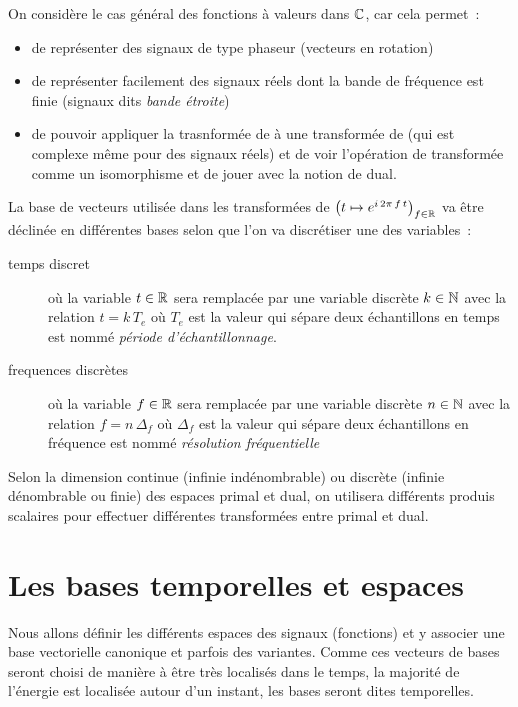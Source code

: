 \begin{remarque}
  On considère le cas général des fonctions à valeurs dans $\mathbb{C}$, car cela permet~:
  \begin{itemize}
  \item de représenter des signaux de type phaseur (vecteurs en rotation)
  \item de représenter facilement des signaux réels dont la bande de
    fréquence est finie (signaux dits \emph{bande étroite})
  \item de pouvoir appliquer la trasnformée de \Fourier{} à une
    transformée de \Fourier{} (qui est complexe même pour des signaux
    réels) et de voir l'opération de transformée comme un isomorphisme
    et de jouer avec la notion de dual.
    \end{itemize}
  \end{remarque}
  

La base de vecteurs utilisée dans les transformées de \Fourier{}
$\left(t\mapsto e^{i\,2\pi\,f\,t}\right)_{f\in\mathbb{R}}$ va être déclinée en différentes
bases selon que l'on va discrétiser une des variables~:

\begin{description}
\item[temps discret] où la variable $t\in\mathbb{R}$ sera remplacée par une variable discrète $k\in\mathbb{N}$ avec la relation $t=k\,T_e$ où $T_e$ est la valeur qui sépare deux échantillons en temps est nommé \emph{période d'échantillonnage}.
\item[frequences discrètes] où la variable $f\in\mathbb{R}$ sera remplacée par une variable discrète $n\in\mathbb{N}$ avec la relation $f=n\,\Delta_f$ où $\Delta_f$ est la valeur qui sépare deux échantillons en fréquence est nommé \emph{résolution fréquentielle}
\end{description}

Selon la dimension continue (infinie indénombrable) ou discrète
(infinie dénombrable ou finie) des espaces primal et dual, on utilisera
différents produis scalaires pour effectuer différentes transformées
entre primal et dual.

\section{Les bases temporelles et espaces}
Nous allons définir les différents espaces des signaux (fonctions) et
y associer une base vectorielle \og canonique\fg{} et parfois des
variantes. Comme ces vecteurs de bases seront choisi de manière à être
très localisés dans le temps, la majorité de l'énergie est localisée
autour d'un instant, les bases seront dites temporelles.

